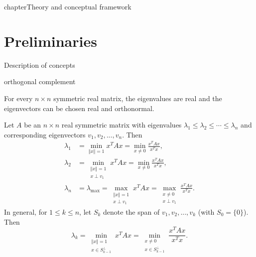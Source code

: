 %
%
\let\textcircled=\pgftextcircled
chapter{Theory and conceptual framework}
\label{Chapter2}

\section{Preliminaries}
Description of concepts


\begin{definition}
orthogonal complement
\end{definition}

\begin{theorem}
	For every $n\times n$ symmetric real matrix, the eigenvalues are real and the eigenvectors can be chosen real and orthonormal.
\end{theorem}

\begin{theorem}
Let $A$ be an $n\times n$ real symmetric matrix with eigenvalues $\lambda_1 \leq \lambda_2 \leq \cdots \leq \lambda_n$ and corresponding eigenvectors $v_1, v_2,..., v_n$. Then 
\begin{align*}
	\lambda_1 &= \min_{\left \Vert x\right\Vert = 1} x^TAx = \min_{ x \neq 0} \frac{x^TAx}{x^Tx}, \\
	\lambda_2 &= \min_{\substack{\left \Vert x\right\Vert = 1 \\ x\perp v_1}} x^TAx = \min_{ x \neq 0} \frac{x^TAx}{x^Tx}, \\
	\lambda_n &= \lambda_{\text{max}} = \max_{\substack{\left \Vert x\right\Vert = 1 \\ x\perp v_1}} x^TAx = \max_{\substack{ x \neq 0 \\ x\perp v_1}} \frac{x^TAx}{x^Tx}.
\end{align*}
In general, for $1\leq k \leq n$, let $S_k$ denote the span of $v_1, v_2,..., v_k$ (with $S_0=\{0\}$). Then 
\begin{displaymath}
	\lambda_k = \min_{\substack{\left \Vert x\right\Vert = 1 \\ x\in S_{k-1}^\perp}} x^TAx = \min_{\substack{x \neq 0 \\ x\in S_{k-1}^\perp}} \frac{x^TAx}{x^Tx}.
\end{displaymath}
\end{theorem}

